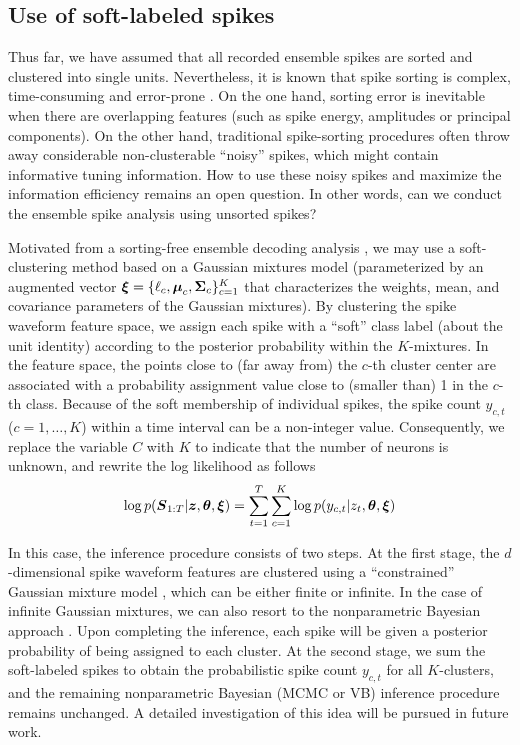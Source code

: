 \subsection{Use of soft-labeled spikes}


Thus far, we have assumed that all recorded ensemble spikes are sorted
and clustered into single units. Nevertheless, it is known that spike
sorting is complex, time-consuming and error-prone
\citep{Wood08,Shalchyan14}.  On the one hand, sorting error is
inevitable when there are overlapping features (such as spike energy,
amplitudes or principal components).  On the other hand, traditional
spike-sorting procedures often throw away considerable non-clusterable
``noisy'' spikes, which might contain informative tuning
information. How to use these noisy spikes and maximize the
information efficiency remains an open question.  In other words, can
we conduct the ensemble spike analysis using unsorted spikes?


Motivated from a sorting-free ensemble decoding analysis
\citep{Chen12b,Kloosterman14}, we may use a soft-clustering method
based on a Gaussian mixtures model (parameterized by an augmented
vector $\boldsymbol{\xi}=\{\ell_c,\boldsymbol{\mu}_c,\boldsymbol{\Sigma}_c\}_{c=1}^K$ that characterizes
the weights, mean, and covariance parameters of the Gaussian
mixtures). By clustering the spike waveform feature space, we assign
each spike with a ``soft'' class label (about the unit identity)
according to the posterior probability within the $K$-mixtures. In the
feature space, the points close to (far away from) the $c$-th cluster
center are associated with a probability assignment value close to
(smaller than) 1 in the $c$-th class. Because of the soft membership
of individual spikes, the spike count $y_{c,t}$ ($c = 1,\dots, K$)
within a time interval can be a non-integer value. Consequently, we
replace the variable $C$ with $K$ to indicate that the number of
neurons is unknown, and rewrite the log likelihood as follows
\begin{eqnarray}                                   
\log p({\boldsymbol{S}}_{1:T}|\boldsymbol{z},\boldsymbol{\theta},\boldsymbol{\xi})= \sum_{t=1}^T \sum_{c=1}^K \log p(y_{c,t}|z_t,\boldsymbol{\theta},\boldsymbol{\xi})
\end{eqnarray}

In this case, the inference procedure consists of two steps. At the
first stage, the $d$-dimensional spike waveform features are clustered
using a ``constrained'' Gaussian mixture model \citep{Zou12}, which
can be either finite or infinite. In the case of infinite Gaussian
mixtures, we can also resort to the nonparametric Bayesian approach
\citep{Rasmussen99,Gorur10,Wood08}. Upon completing the inference,
each spike will be given a posterior probability of being assigned to
each cluster.  At the second stage, we sum the soft-labeled spikes to
obtain the probabilistic spike count $y_{c,t}$ for all $K$-clusters,
and the remaining nonparametric Bayesian (MCMC or VB) inference
procedure remains unchanged. A detailed investigation of this idea
will be pursued in future work.




